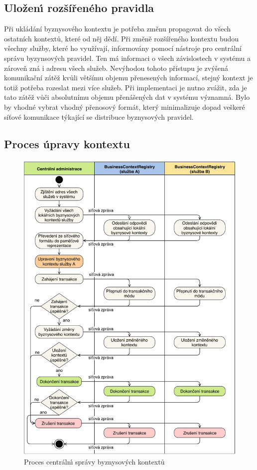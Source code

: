 \subsection{Uložen\'{\i} rozšířeného pravidla}\label{sec:saving-context}

Při ukládání byznysového kontextu je potřeba změnu propagovat do všech ostatních kontextů, které od něj dědí.
Při změně rozšířeného kontextu budou všechny služby, které ho využívají, informovány pomocí nástroje pro
centrální správu byzynsových pravidel. Ten má informaci o všech závislostech v systému a zároveň zná i adresu všech
služeb. Nevýhodou tohoto přístupu je zvýšená komunikační zátěž kvůli většímu objemu přenesených informací, stejný kontext
je totiž potřeba rozeslat mezi více služeb. Při implementaci je nutno zvážit, zda je tato zátěž vůči absolutnímu objemu
přenášených dat v systému významná. Bylo by vhodné vybrat vhodný přenosový formát, který minimalizuje dopad veškeré síťové
komunikace týkající se distribuce byznysových pravidel.

\subsection{Proces úpravy kontextu}

\begin{figure}
    \centering
    \includegraphics[keepaspectratio=true, width=\linewidth]{figures/business-context-management.pdf}
    \caption{Proces centráln\'{\i} správy byznysov\'ych kontextů}
    \label{fig:business-context-management}
\end{figure}


